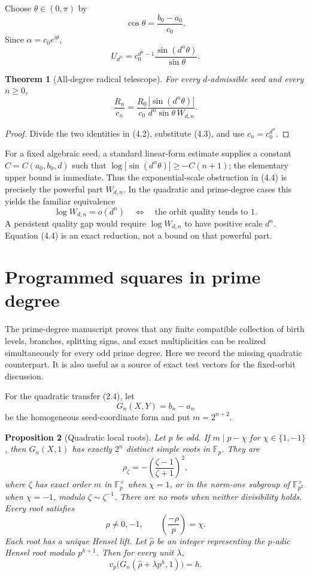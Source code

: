 \documentclass[11pt]{article}
\newtheorem{theorem}{Theorem}
\newtheorem{proposition}[theorem]{Proposition}
\theoremstyle{definition}
\theoremstyle{remark}
\begin{document}
Choose \(\theta\in(0,\pi)\) by
\[
 \cos\theta=\frac{b_0-a_0}{c_0}.
\]
Since \(\alpha=c_0e^{i\theta}\),
\[
 U_{d^n}=c_0^{d^n-1}
 \frac{\sin(d^n\theta)}{\sin\theta}.
 \tag{4.3}
\]

\begin{theorem}[All-degree radical telescope]\label{thm:telescope}
For every $d$-admissible seed and every $n\ge0$,
\[
 \boxed{
 \frac{R_n}{c_n}
 =\frac{R_0}{c_0}
  \frac{|\sin(d^n\theta)|}
       {d^n\sin\theta\,W_{d,n}}.}
 \tag{4.4}
\]
\end{theorem}

\begin{proof}
Divide the two identities in (4.2), substitute (4.3), and use
\(c_n=c_0^{d^n}\).
\end{proof}

For a fixed algebraic seed, a standard linear-form estimate supplies a
constant \(C=C(a_0,b_0,d)\) such that
\(\log|\sin(d^n\theta)|\ge-C(n+1)\);
the elementary upper bound is immediate.  Thus the exponential-scale
obstruction in (4.4) is precisely the powerful part $W_{d,n}$.  In the
quadratic and prime-degree cases this yields the familiar equivalence
\[
 \log W_{d,n}=o(d^n)
 \quad\Longleftrightarrow\quad
 \text{the orbit quality tends to }1.
 \tag{4.5}
\]
A persistent quality gap would require \(\log W_{d,n}\) to have positive
scale $d^n$.  Equation (4.4) is an exact reduction, not a bound on that
powerful part.

\section{Programmed squares in prime degree}

The prime-degree manuscript proves that any finite compatible collection
of birth levels, branches, splitting signs, and exact multiplicities can
be realized simultaneously for every odd prime degree.  Here we record
the missing quadratic counterpart.  It is also useful as a source of exact
test vectors for the fixed-orbit discussion.

For the quadratic transfer (2.4), let
\[
 G_n(X,Y)=b_n-a_n
\]
be the homogeneous seed-coordinate form and put \(m=2^{n+2}\).

\begin{proposition}[Quadratic local roots]\label{prop:quadratic-roots}
Let $p$ be odd.  If $m\mid p-\chi$ for
\(\chi\in\{1,-1\}\), then \(G_n(X,1)\) has exactly $2^n$ distinct
simple roots in \(\mathbb F_p\).  They are
\[
 \rho_\zeta=-\left(\frac{\zeta-1}{\zeta+1}\right)^2,
 \tag{5.1}
\]
where \(\zeta\) has exact order $m$ in \(\mathbb F_p^\times\) when
\(\chi=1\), or in the norm-one subgroup of \(\mathbb F_{p^2}^\times\)
when \(\chi=-1\), modulo \(\zeta\sim\zeta^{-1}\).  There are no roots
when neither divisibility holds.  Every root satisfies
\[
 \rho\ne0,-1,\qquad
 \left(\frac{-\rho}{p}\right)=\chi.
 \tag{5.2}
\]
Each root has a unique Hensel lift.  Let \(\widehat\rho\) be an integer
representing the \(p\)-adic Hensel root modulo \(p^{h+1}\).  Then for every
unit \(\lambda\),
\[
 v_p\bigl(G_n(\widehat\rho+\lambda p^h,1)\bigr)=h.
 \tag{5.3}
\]
\end{proposition}
\end{document}
